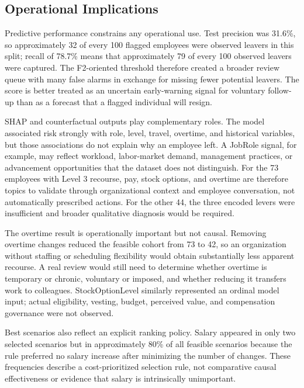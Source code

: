 \documentclass[11pt]{article}
\begin{document}
\subsection{Operational Implications}
Predictive performance constrains any operational use. Test precision was 31.6\%, so approximately 32 of every 100 flagged employees were observed leavers in this split; recall of 78.7\% means that approximately 79 of every 100 observed leavers were captured. The F2-oriented threshold therefore created a broader review queue with many false alarms in exchange for missing fewer potential leavers. The score is better treated as an uncertain early-warning signal for voluntary follow-up than as a forecast that a flagged individual will resign.

SHAP and counterfactual outputs play complementary roles. The model associated risk strongly with role, level, travel, overtime, and historical variables, but those associations do not explain why an employee left. A JobRole signal, for example, may reflect workload, labor-market demand, management practices, or advancement opportunities that the dataset does not distinguish. For the 73 employees with Level 3 recourse, pay, stock options, and overtime are therefore topics to validate through organizational context and employee conversation, not automatically prescribed actions. For the other 44, the three encoded levers were insufficient and broader qualitative diagnosis would be required.

The overtime result is operationally important but not causal. Removing overtime changes reduced the feasible cohort from 73 to 42, so an organization without staffing or scheduling flexibility would obtain substantially less apparent recourse. A real review would still need to determine whether overtime is temporary or chronic, voluntary or imposed, and whether reducing it transfers work to colleagues. StockOptionLevel similarly represented an ordinal model input; actual eligibility, vesting, budget, perceived value, and compensation governance were not observed.

Best scenarios also reflect an explicit ranking policy. Salary appeared in only two selected scenarios but in approximately 80\% of all feasible scenarios because the rule preferred no salary increase after minimizing the number of changes. These frequencies describe a cost-prioritized selection rule, not comparative causal effectiveness or evidence that salary is intrinsically unimportant.
\end{document}
